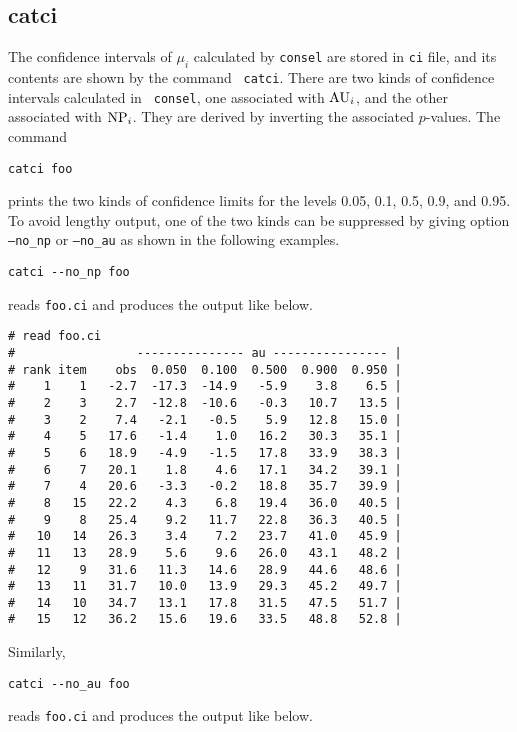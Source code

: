 \documentclass[12pt]{article}
\begin{document}
\subsection{catci}

The confidence intervals of $\mu_i$ calculated by {\tt consel} are
stored in {\tt ci} file, and its contents are shown by the command {\tt
catci}.  There are two kinds of confidence intervals calculated in {\tt
consel}, one associated with ${\rm AU}_i$, and the other associated
with ${\rm NP}_i$. They are derived by inverting the associated
$p$-values. The command
\begin{verbatim}
catci foo
\end{verbatim}
prints the two kinds of confidence limits for the levels 0.05, 0.1, 0.5,
0.9, and 0.95. To avoid lengthy output, one of the two kinds can be
suppressed by giving option {\tt --no{\_}np} or {\tt --no{\_}au} as
shown in the following examples.
\begin{verbatim}
catci --no_np foo
\end{verbatim}
reads {\tt foo.ci} and produces the output like below.
{\small
\begin{verbatim}
# read foo.ci
#                 --------------- au ---------------- |
# rank item    obs  0.050  0.100  0.500  0.900  0.950 |
#    1    1   -2.7  -17.3  -14.9   -5.9    3.8    6.5 |
#    2    3    2.7  -12.8  -10.6   -0.3   10.7   13.5 |
#    3    2    7.4   -2.1   -0.5    5.9   12.8   15.0 |
#    4    5   17.6   -1.4    1.0   16.2   30.3   35.1 |
#    5    6   18.9   -4.9   -1.5   17.8   33.9   38.3 |
#    6    7   20.1    1.8    4.6   17.1   34.2   39.1 |
#    7    4   20.6   -3.3   -0.2   18.8   35.7   39.9 |
#    8   15   22.2    4.3    6.8   19.4   36.0   40.5 |
#    9    8   25.4    9.2   11.7   22.8   36.3   40.5 |
#   10   14   26.3    3.4    7.2   23.7   41.0   45.9 |
#   11   13   28.9    5.6    9.6   26.0   43.1   48.2 |
#   12    9   31.6   11.3   14.6   28.9   44.6   48.6 |
#   13   11   31.7   10.0   13.9   29.3   45.2   49.7 |
#   14   10   34.7   13.1   17.8   31.5   47.5   51.7 |
#   15   12   36.2   15.6   19.6   33.5   48.8   52.8 |
\end{verbatim}
}
Similarly,
\begin{verbatim}
catci --no_au foo
\end{verbatim}
reads {\tt foo.ci} and produces the output like below.
\end{document}
